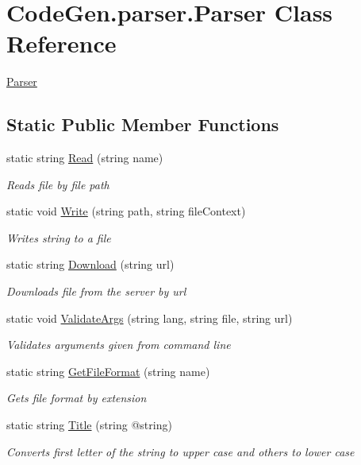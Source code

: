 \hypertarget{classCodeGen_1_1parser_1_1Parser}{}\section{Code\+Gen.\+parser.\+Parser Class Reference}
\label{classCodeGen_1_1parser_1_1Parser}


\mbox{\hyperlink{classCodeGen_1_1parser_1_1Parser}{Parser}}  


\subsection*{Static Public Member Functions}
\begin{DoxyCompactItemize}
\item 
static string \mbox{\hyperlink{classCodeGen_1_1parser_1_1Parser_af3a5d34f3773eff03e97c42b40ea3e96}{Read}} (string name)
\begin{DoxyCompactList}\small\item\em Reads file by file path \end{DoxyCompactList}\item 
static void \mbox{\hyperlink{classCodeGen_1_1parser_1_1Parser_a1d09a5fa154036958d654c65d3e64d7b}{Write}} (string path, string file\+Context)
\begin{DoxyCompactList}\small\item\em Writes string to a file \end{DoxyCompactList}\item 
static string \mbox{\hyperlink{classCodeGen_1_1parser_1_1Parser_aa8dc1a017c221d468885fd1ad7043de4}{Download}} (string url)
\begin{DoxyCompactList}\small\item\em Downloads file from the server by url \end{DoxyCompactList}\item 
static void \mbox{\hyperlink{classCodeGen_1_1parser_1_1Parser_addb0a8b1127eb9907303d4c09c2bf841}{Validate\+Args}} (string lang, string file, string url)
\begin{DoxyCompactList}\small\item\em Validates arguments given from command line \end{DoxyCompactList}\item 
static string \mbox{\hyperlink{classCodeGen_1_1parser_1_1Parser_a3297d7993fc6c739b3ff74f469c0589a}{Get\+File\+Format}} (string name)
\begin{DoxyCompactList}\small\item\em Gets file format by extension \end{DoxyCompactList}\item 
static string \mbox{\hyperlink{classCodeGen_1_1parser_1_1Parser_aaa59afdc45cfc1c9583c40e11791fc15}{Title}} (string @string)
\begin{DoxyCompactList}\small\item\em Converts first letter of the string to upper case and others to lower case \end{DoxyCompactList}\end{DoxyCompactItemize}


